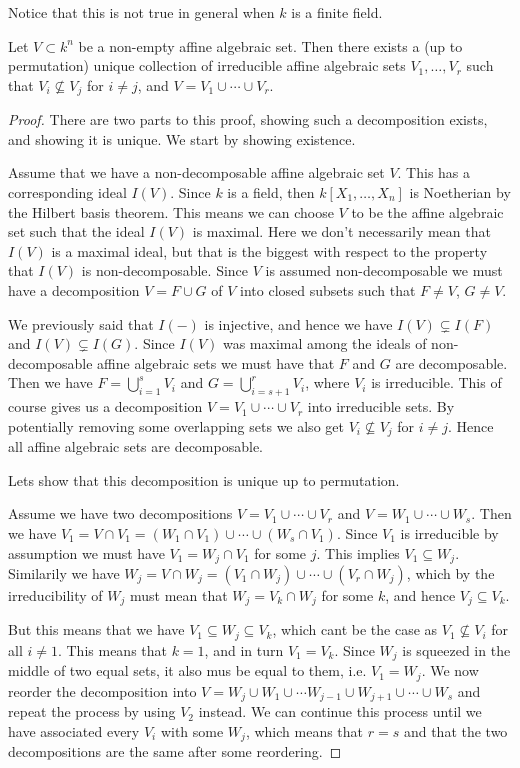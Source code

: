 Notice that this is not true in general when $k$ is a finite field.

\begin{theorem}
Let $V\subset k^n$ be a non-empty affine algebraic set. Then there exists a (up to permutation) unique collection of irreducible affine algebraic sets $V_1, \ldots, V_r$ such that $V_i \nsubseteq V_j$ for $i\neq j$, and $V=V_1\cup \cdots \cup V_r$. 
\end{theorem}
\begin{proof}
There are two parts to this proof, showing such a decomposition exists, and showing it is unique. We start by showing existence.

Assume that we have a non-decomposable affine algebraic set $V$. This has a corresponding ideal $I(V)$. Since $k$ is a field, then $k[X_1, \ldots, X_n]$ is Noetherian by the Hilbert basis theorem. This means we can choose $V$ to be the affine algebraic set such that the ideal $I(V)$ is maximal. Here we don't necessarily mean that $I(V)$ is a maximal ideal, but that is the biggest with respect to the property that $I(V)$ is non-decomposable. Since $V$ is assumed non-decomposable we must have a decomposition $V=F\cup G$ of $V$ into closed subsets such that $F\neq V$, $G\neq V$. 

We previously said that $I(-)$ is injective, and hence we have $I(V)\subsetneq I(F)$ and $I(V)\subsetneq I(G)$. Since $I(V)$ was maximal among the ideals of non-decomposable affine algebraic sets we must have that $F$ and $G$ are decomposable. Then we have $F=\bigcup_{i=1}^s V_i$ and $G=\bigcup_{i=s+1}^r V_i$, where $V_i$ is irreducible. This of course gives us a decomposition $V=V_1\cup\cdots\cup V_r$ into irreducible sets. By potentially removing some overlapping sets we also get $V_i\nsubseteq V_j$ for $i\neq j$. Hence all affine algebraic sets are decomposable. 

Lets show that this decomposition is unique up to permutation. 

Assume we have two decompositions $V=V_1\cup\cdots\cup V_r$ and $V=W_1\cup\cdots\cup W_s$. Then we have $V_1 = V\cap V_1 = (W_1\cap V_1)\cup\cdots\cup (W_s\cap V_1)$. Since $V_1$ is irreducible by assumption we must have $V_1=W_j\cap V_1$ for some $j$. This implies $V_1\subseteq W_j$. Similarily we have $W_j = V\cap W_j = (V_1 \cap W_j)\cup\cdots\cup (V_r\cap W_j)$, which by the irreducibility of $W_j$ must mean that $W_j = V_k\cap W_j$ for some $k$, and hence $V_j\subseteq V_k$. 

But this means that we have $V_1\subseteq W_j\subseteq V_k$, which cant be the case as $V_1\nsubseteq V_i$ for all $i\neq 1$. This means that $k=1$, and in turn $V_1=V_k$. Since $W_j$ is squeezed in the middle of two equal sets, it also mus be equal to them, i.e. $V_1=W_j$. We now reorder the decomposition into $V=W_j\cup W_1\cup\cdots W_{j-1}\cup W_{j+1}\cup\cdots\cup W_s$ and repeat the process by using $V_2$ instead. We can continue this process until we have associated every $V_i$ with some $W_j$, which means that $r=s$ and that the two decompositions are the same after some reordering. 
\end{proof}


